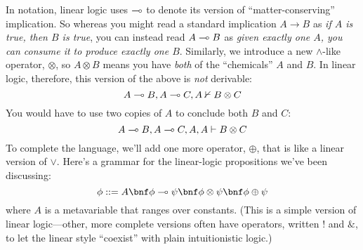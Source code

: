 In notation, linear logic uses $\multimap$ to denote its version of
``matter-conserving'' implication.
So whereas you might read a standard implication $A \to B$ as \emph{if $A$ is
true, then $B$ is true}, you can instead read $A \multimap B$ as \emph{given
exactly one $A$, you can consume it to produce exactly one $B$}.
Similarly, we introduce a new $\wedge$-like operator, $\otimes$, so $A \otimes
B$ means you have \emph{both} of the ``chemicals'' $A$ and $B$.
In linear logic, therefore, this version of the above is \emph{not} derivable:
%
$$A \multimap B, A \multimap C, A \nvdash B \otimes C$$
%
You would have to use two copies of $A$ to conclude both $B$ and $C$:
%
$$A \multimap B, A \multimap C, A, A \vdash B \otimes C$$
%
To complete the language, we'll add one more operator, $\oplus$, that is like
a linear version of $\vee$.
Here's a grammar for the linear-logic propositions we've been discussing:
%
\[
\phi ::= A \bnf
\phi \lolly \psi \bnf
\phi \otimes \psi \bnf
\phi \oplus \psi
\]
%
where $A$ is a metavariable that ranges over constants.
(This is a simple version of linear logic---other, more complete versions
often have operators, written $!$ and $\&$, to let the linear style
``coexist'' with plain intuitionistic logic.)

